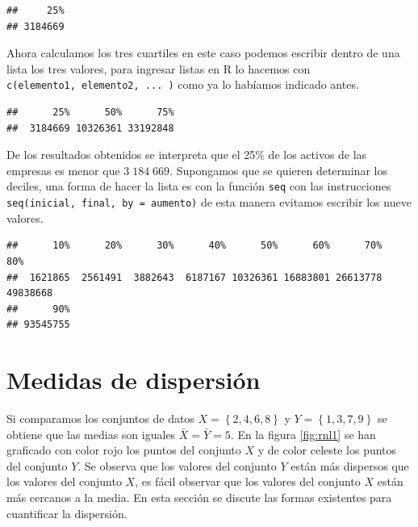 \documentclass[]{book}
\newenvironment{Shaded}{\begin{snugshade}}{\end{snugshade}}
\newcommand{\DataTypeTok}[1]{\textcolor[rgb]{0.13,0.29,0.53}{#1}}
\newcommand{\FloatTok}[1]{\textcolor[rgb]{0.00,0.00,0.81}{#1}}
\newcommand{\KeywordTok}[1]{\textcolor[rgb]{0.13,0.29,0.53}{\textbf{#1}}}
\newcommand{\NormalTok}[1]{#1}
\newcommand{\OperatorTok}[1]{\textcolor[rgb]{0.81,0.36,0.00}{\textbf{#1}}}
\begin{document}
\begin{verbatim}
##     25% 
## 3184669
\end{verbatim}

Ahora calculamos los tres cuartiles en este caso podemos escribir dentro de una lista los tres valores, para ingresar listas en R lo hacemos con \texttt{c(elemento1,\ elemento2,\ ...\ )} como ya lo habíamos indicado antes.

\begin{Shaded}
\end{Shaded}

\begin{verbatim}
##      25%      50%      75% 
##  3184669 10326361 33192848
\end{verbatim}

De los resultados obtenidos se interpreta que el 25\% de los activos de las empresas es menor que \(3\;184\;669\). Supongamos que se quieren determinar los deciles, una forma de hacer la lista es con la función \texttt{seq} con las instrucciones \texttt{seq(inicial,\ final,\ by\ =\ aumento)} de esta manera evitamos escribir los nueve valores.

\begin{Shaded}
\end{Shaded}

\begin{verbatim}
##      10%      20%      30%      40%      50%      60%      70%      80% 
##  1621865  2561491  3882643  6187167 10326361 16883801 26613778 49838668 
##      90% 
## 93545755
\end{verbatim}

\hypertarget{dispersion}{%
\section{Medidas de dispersión}\label{dispersion}}

Si comparamos los conjuntos de datos \(X=\left\{ 2,4,6,8 \right\}\) y \(Y=\left\{1,3,7,9\right\}\) se obtiene que las medias son iguales \(\bar{X}= \bar{Y}=5\). En la figura \ref{fig:rnl1} se han graficado con color rojo los puntos del conjunto \(X\) y de color celeste los puntos del conjunto \(Y\). Se observa que los valores del conjunto \(Y\) están más dispersos que los valores del conjunto \(X\), es fácil observar que los valores del conjunto \(X\) están más cercanos a la media. En esta sección se discute las formas existentes para cuantificar la dispersión.
\end{document}
